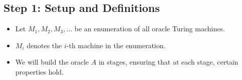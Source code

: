 \documentclass{article}
\begin{document}








\subsection*{Step 1: Setup and Definitions}

\begin{itemize}
    \item Let $M_1, M_2, M_3, \ldots$ be an enumeration of all oracle Turing machines.
    \item $M_i$ denotes the $i$-th machine in the enumeration.
    \item We will build the oracle $A$ in stages, ensuring that at each stage, certain properties hold.
\end{itemize}
\end{document}
